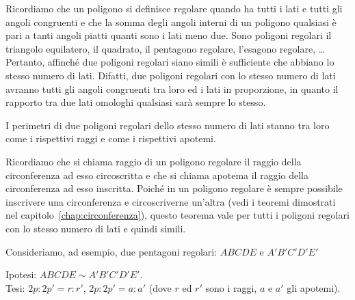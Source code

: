 Ricordiamo che un poligono si definisce regolare quando ha tutti i 
lati e tutti gli angoli congruenti e che la somma degli angoli 
interni di un poligono qualsiasi è pari a tanti angoli piatti quanti 
sono i lati meno due. Sono poligoni regolari il triangolo equilatero, 
il quadrato, il pentagono regolare, l'esagono regolare, \ldots{} 
Pertanto, affinché due poligoni regolari siano simili è sufficiente 
che abbiano lo stesso numero di lati. Difatti, due poligoni regolari 
con lo stesso numero di lati avranno tutti gli angoli congruenti tra 
loro ed i lati in proporzione, in quanto il rapporto tra due lati 
omologhi qualsiasi sarà sempre lo stesso.

\begin{teorema}
I perimetri di due poligoni regolari dello stesso numero di lati 
stanno tra loro come i rispettivi raggi e come i rispettivi apotemi.
\end{teorema}

Ricordiamo che si chiama raggio di un poligono regolare il raggio 
della circonferenza ad esso circoscritta e che si chiama apotema il 
raggio della circonferenza ad esso inscritta. Poiché in un poligono 
regolare è sempre possibile inscrivere una circonferenza e 
circoscriverne un'altra (vedi i teoremi dimostrati nel 
capitolo~\ref{chap:circonferenza}), questo teorema vale per tutti i 
poligoni regolari con lo stesso numero di lati e quindi simili.

Consideriamo, ad esempio, due pentagoni regolari: \(ABCDE\) e 
\(A'B'C'D'E'\)

\noindent Ipotesi: \(ABCDE\sim A'B'C'D'E'\).\\
Tesi: \(2p : 2p' = r : r'\), \(2p : 2p' = a : a'\) (dove \(r\) ed \(r'\) sono 
i raggi, \(a\) e \(a'\) gli apotemi).

\begin{center}
\scalebox{.8}{}
\end{center}


